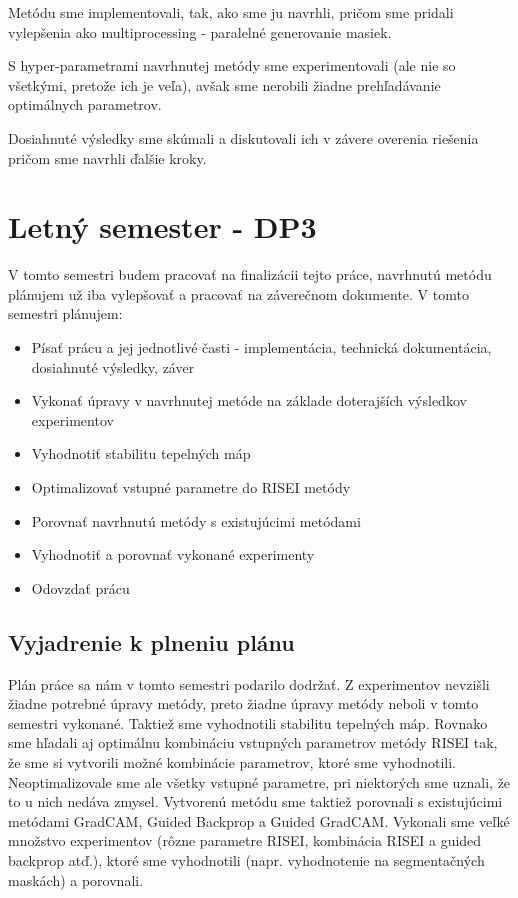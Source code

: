     Metódu sme implementovali, tak, ako sme ju navrhli, pričom sme pridali vylepšenia ako multiprocessing - paralelné generovanie masiek.

    S hyper-parametrami navrhnutej metódy sme experimentovali (ale nie so všetkými, pretože ich je veľa), avšak sme nerobili žiadne prehľadávanie optimálnych parametrov.

    Dosiahnuté výsledky sme skúmali a diskutovali ich v závere overenia riešenia pričom sme navrhli ďalšie kroky.


\section{Letný semester - DP3}

    
    V tomto semestri budem pracovať na finalizácii tejto práce, navrhnutú metódu plánujem už iba vylepšovať a pracovať na záverečnom dokumente. V tomto semestri plánujem:
    
    \begin{itemize}
        \item Písať prácu a jej jednotlivé časti - implementácia, technická dokumentácia, dosiahnuté výsledky, záver
        \item Vykonať úpravy v navrhnutej metóde na základe doterajších výsledkov experimentov
        \item Vyhodnotiť stabilitu tepelných máp
        \item Optimalizovať vstupné parametre do RISEI metódy
        \item Porovnať navrhnutú metódy s existujúcimi metódami
        \item Vyhodnotiť a porovnať vykonané experimenty
        \item Odovzdať prácu
    \end{itemize}
    
    \subsection{Vyjadrenie k plneniu plánu}
    
    Plán práce sa nám v tomto semestri podarilo dodržať.
    Z experimentov nevzišli žiadne potrebné úpravy metódy, preto žiadne úpravy metódy neboli v tomto semestri vykonané. Taktiež sme vyhodnotili stabilitu tepelných máp. Rovnako sme hľadali aj optimálnu kombináciu vstupných parametrov metódy RISEI tak, že sme si vytvorili možné kombinácie parametrov, ktoré sme vyhodnotili. Neoptimalizovale sme ale všetky vstupné parametre, pri niektorých sme uznali, že to u nich nedáva zmysel. Vytvorenú metódu sme taktiež porovnali s existujúcimi metódami GradCAM, Guided Backprop a Guided GradCAM. Vykonali sme veľké množstvo experimentov (rôzne parametre RISEI, kombinácia RISEI a guided backprop atď.), ktoré sme vyhodnotili (napr. vyhodnotenie na segmentačných maskách) a porovnali.
